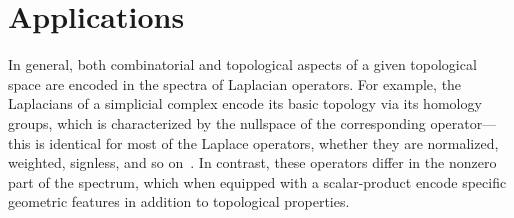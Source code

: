 \documentclass[12pt]{article}
\numberwithin{equation}{section}
\newcommand{\+}{%
	\raisebox{0.18ex}{\scaleobj{0.55}{+}}
}
\newtheorem{corollary}{Corollary}
\theoremstyle{definition}
\begin{document}





\newpage

\newpage

\section{Applications}\label{sec:applications}


In general, both combinatorial and topological aspects of a given topological space are encoded in the spectra of Laplacian operators. 
For example, the Laplacians of a simplicial complex encode its basic topology via its homology groups, which is characterized by the nullspace of the corresponding operator---this is identical for most of the Laplace operators, whether they are normalized, weighted, signless, and so on~\cite{}.
In contrast, these operators differ in the nonzero part of the spectrum, which when equipped with a scalar-product encode specific geometric features in addition to topological properties. 

\end{document}
